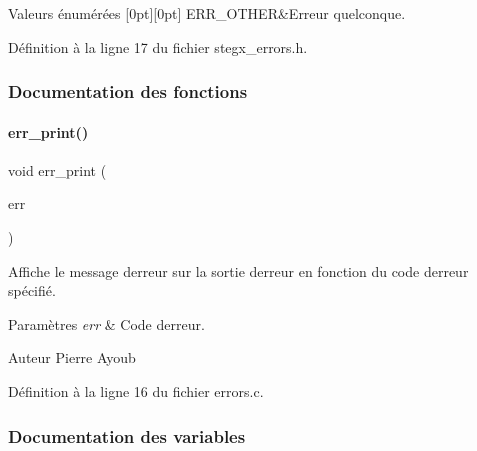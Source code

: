 \begin{DoxyEnumFields}{Valeurs énumérées}
[0pt][0pt]{}\mbox{\label{a00011_a08b18ac8af0f3462354240d9732f3852a2a8c1bd6dbc0284d37030091f6c9296f}} 
E\+R\+R\+\_\+\+O\+T\+H\+ER&Erreur quelconque. \\
\hline

\end{DoxyEnumFields}


Définition à la ligne 17 du fichier stegx\+\_\+errors.\+h.



\subsubsection{Documentation des fonctions}
\mbox{\label{a00011_a5d0d86cd09d47446c87bf95c6f83cfb5}} 
\paragraph{\texorpdfstring{err\+\_\+print()}{err\_print()}}
{\footnotesize\ttfamily void err\+\_\+print (\begin{DoxyParamCaption}\item[{const enum \hyperlink{a00011_a08b18ac8af0f3462354240d9732f3852}{err\+\_\+code}}]{err }\end{DoxyParamCaption})}

Affiche le message d\textquotesingle{}erreur sur la sortie d\textquotesingle{}erreur en fonction du code d\textquotesingle{}erreur spécifié. 
\begin{DoxyParams}{Paramètres}
{\em err} & Code d\textquotesingle{}erreur. \\
\hline
\end{DoxyParams}
\begin{DoxyAuthor}{Auteur}
Pierre Ayoub 
\end{DoxyAuthor}


Définition à la ligne 16 du fichier errors.\+c.



\subsubsection{Documentation des variables}
\mbox{\label{a00011_a5ec48ccdfbe19fe23855818f8556abec}} 

